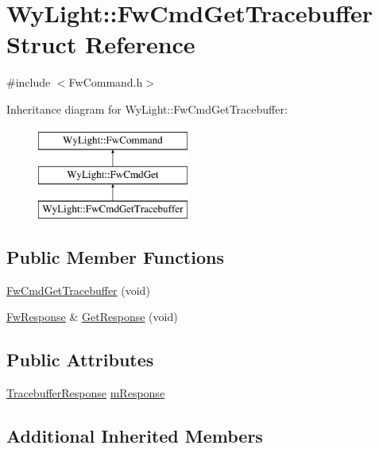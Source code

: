 \hypertarget{struct_wy_light_1_1_fw_cmd_get_tracebuffer}{\section{Wy\-Light\-:\-:Fw\-Cmd\-Get\-Tracebuffer Struct Reference}
\label{struct_wy_light_1_1_fw_cmd_get_tracebuffer}
}


{\ttfamily \#include $<$Fw\-Command.\-h$>$}

Inheritance diagram for Wy\-Light\-:\-:Fw\-Cmd\-Get\-Tracebuffer\-:\begin{figure}[H]
\begin{center}
\leavevmode
\includegraphics[height=3.000000cm]{struct_wy_light_1_1_fw_cmd_get_tracebuffer}
\end{center}
\end{figure}
\subsection*{Public Member Functions}
\begin{DoxyCompactItemize}
\item 
\hyperlink{struct_wy_light_1_1_fw_cmd_get_tracebuffer_a3deef7bcb0eafde8f9c97428da016b08}{Fw\-Cmd\-Get\-Tracebuffer} (void)
\item 
\hyperlink{class_wy_light_1_1_fw_response}{Fw\-Response} \& \hyperlink{struct_wy_light_1_1_fw_cmd_get_tracebuffer_a3c6291a4be3b4451dc1cdf1b21488d39}{Get\-Response} (void)
\end{DoxyCompactItemize}
\subsection*{Public Attributes}
\begin{DoxyCompactItemize}
\item 
\hyperlink{class_wy_light_1_1_tracebuffer_response}{Tracebuffer\-Response} \hyperlink{struct_wy_light_1_1_fw_cmd_get_tracebuffer_ae7ba6567ab462ad9237f4a35365fcb5f}{m\-Response}
\end{DoxyCompactItemize}
\subsection*{Additional Inherited Members}


